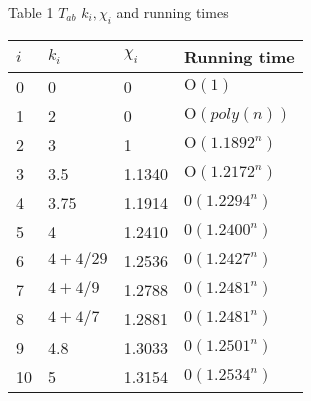 \documentclass{sigchi}
\begin{document}
\begin{center}
	Table 1 $T_{a b}$
	$k_{i}, \chi_{i}$ and running times \\
	\begin{tabular}{llll}
		\hline$i$ & $k_{i}$ & $\chi_{i}$ & Running time \\
		\hline 0 & 0 & 0 & $\mathrm{O}(1)$ \\
		1 & 2 & 0 & $\mathrm{O}(p o l y(n))$ \\
		2 & 3 & 1& $\mathrm{O}\left(1.1892^{n}\right)$ \\
		3 & 3.5 &1.1340& $\mathrm{O}\left(1.2172^{n}\right)$ \\
		4 & 3.75&1.1914 & $0\left(1.2294^{n}\right)$ \\
		5 & 4 & 1.2410&$0\left(1.2400^{n}\right)$ \\
		6 & $4+4 / 29$ & 1.2536& $0\left(1.2427^{n}\right)$ \\
		7 & $4+4 / 9$ &1.2788& $0\left(1.2481^{n}\right)$ \\
		8 & $4+4 / 7$ &1.2881& $0\left(1.2481^{n}\right)$ \\
		9 & 4.8 &1.3033& $0\left(1.2501^{n}\right)$ \\
		10 & 5 & 1.3154& $0\left(1.2534^{n}\right)$ \\
		\hline
	\end{tabular}\\
	
\end{center}
\end{document}
